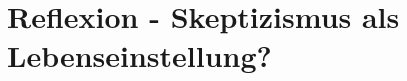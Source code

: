 \documentclass[12pt]{beamer}
\begin{document}
\section{Reflexion - Skeptizismus als Lebenseinstellung?}
%
%
\end{document}
